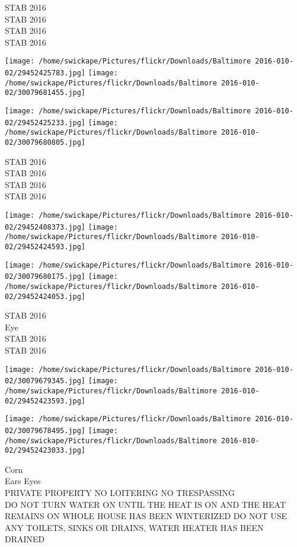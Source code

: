 \documentclass[10pt,letterpaper]{article}
\begin{document}
STAB 2016\\
STAB 2016\\
STAB 2016\\
STAB 2016
\pagebreak

\texttt{[image: /home/swickape/Pictures/flickr/Downloads/Baltimore 2016-010-02/29452425783.jpg]}
\texttt{[image: /home/swickape/Pictures/flickr/Downloads/Baltimore 2016-010-02/30079681455.jpg]}

\texttt{[image: /home/swickape/Pictures/flickr/Downloads/Baltimore 2016-010-02/29452425233.jpg]}
\texttt{[image: /home/swickape/Pictures/flickr/Downloads/Baltimore 2016-010-02/30079680805.jpg]}

STAB 2016\\
STAB 2016\\
STAB 2016\\
STAB 2016
\pagebreak

\texttt{[image: /home/swickape/Pictures/flickr/Downloads/Baltimore 2016-010-02/29452408373.jpg]}
\texttt{[image: /home/swickape/Pictures/flickr/Downloads/Baltimore 2016-010-02/29452424593.jpg]}

\texttt{[image: /home/swickape/Pictures/flickr/Downloads/Baltimore 2016-010-02/30079680175.jpg]}
\texttt{[image: /home/swickape/Pictures/flickr/Downloads/Baltimore 2016-010-02/29452424053.jpg]}

STAB 2016\\
Eye\\
STAB 2016\\
STAB 2016
\pagebreak

\texttt{[image: /home/swickape/Pictures/flickr/Downloads/Baltimore 2016-010-02/30079679345.jpg]}
\texttt{[image: /home/swickape/Pictures/flickr/Downloads/Baltimore 2016-010-02/29452423593.jpg]}

\texttt{[image: /home/swickape/Pictures/flickr/Downloads/Baltimore 2016-010-02/30079678495.jpg]}
\texttt{[image: /home/swickape/Pictures/flickr/Downloads/Baltimore 2016-010-02/29452423033.jpg]}

Corn\\
Ears Eyes\\
PRIVATE PROPERTY NO LOITERING NO TRESPASSING\\
DO NOT TURN WATER ON UNTIL THE HEAT IS ON AND THE HEAT REMAINS ON WHOLE HOUSE HAS BEEN WINTERIZED DO NOT USE ANY TOILETS, SINKS OR DRAINS, WATER HEATER HAS BEEN DRAINED
\pagebreak
\end{document}
